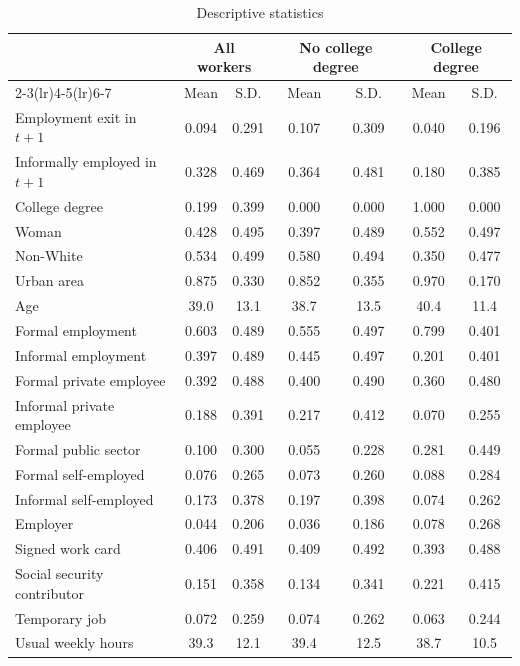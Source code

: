 \begin{table}[H]
\centering
\caption{Descriptive statistics}
\label{tab:descriptives}
\begin{threeparttable}
\begin{tabular}{lcccccc}
\toprule
& \multicolumn{2}{c}{All workers} & \multicolumn{2}{c}{No college degree} & \multicolumn{2}{c}{College degree} \\
\cmidrule(lr){2-3}\cmidrule(lr){4-5}\cmidrule(lr){6-7}
& Mean & S.D. & Mean & S.D. & Mean & S.D. \\
\midrule
Employment exit in $t+1$ & 0.094 & 0.291 & 0.107 & 0.309 & 0.040 & 0.196 \\
Informally employed in $t+1$ & 0.328 & 0.469 & 0.364 & 0.481 & 0.180 & 0.385 \\
College degree & 0.199 & 0.399 & 0.000 & 0.000 & 1.000 & 0.000 \\
Woman & 0.428 & 0.495 & 0.397 & 0.489 & 0.552 & 0.497 \\
Non-White & 0.534 & 0.499 & 0.580 & 0.494 & 0.350 & 0.477 \\
Urban area & 0.875 & 0.330 & 0.852 & 0.355 & 0.970 & 0.170 \\
Age & 39.0 & 13.1 & 38.7 & 13.5 & 40.4 & 11.4 \\
Formal employment & 0.603 & 0.489 & 0.555 & 0.497 & 0.799 & 0.401 \\
Informal employment & 0.397 & 0.489 & 0.445 & 0.497 & 0.201 & 0.401 \\
\addlinespace
Formal private employee & 0.392 & 0.488 & 0.400 & 0.490 & 0.360 & 0.480 \\
Informal private employee & 0.188 & 0.391 & 0.217 & 0.412 & 0.070 & 0.255 \\
Formal public sector & 0.100 & 0.300 & 0.055 & 0.228 & 0.281 & 0.449 \\
Formal self-employed & 0.076 & 0.265 & 0.073 & 0.260 & 0.088 & 0.284 \\
Informal self-employed & 0.173 & 0.378 & 0.197 & 0.398 & 0.074 & 0.262 \\
Employer & 0.044 & 0.206 & 0.036 & 0.186 & 0.078 & 0.268 \\
Signed work card & 0.406 & 0.491 & 0.409 & 0.492 & 0.393 & 0.488 \\
Social security contributor & 0.151 & 0.358 & 0.134 & 0.341 & 0.221 & 0.415 \\
Temporary job & 0.072 & 0.259 & 0.074 & 0.262 & 0.063 & 0.244 \\
Usual weekly hours & 39.3 & 12.1 & 39.4 & 12.5 & 38.7 & 10.5 \\

\end{tabular}
\end{threeparttable}
\end{table}
